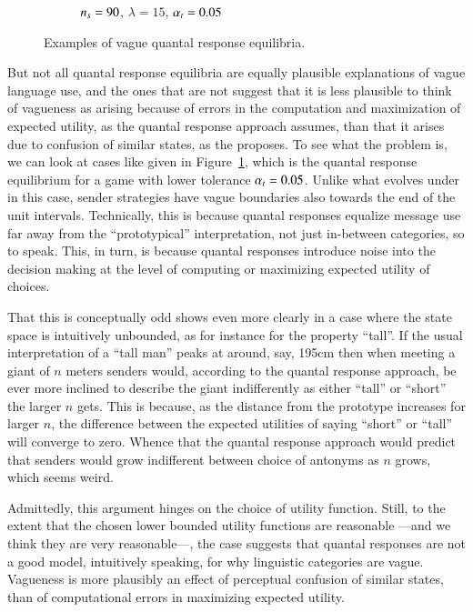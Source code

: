 \begin{figure}
\begin{subfigure}[]{0.45\textwidth}
    \caption{$n_s = 90$, $\lambda = 15$, $\alpha_t = 0.05$}
    \label{fig:exampleQRE_stratsB}
  \end{subfigure}

  \caption{Examples of vague quantal response equilibria.}
  \label{fig:exampleQREs}
\end{figure}


But not all quantal response equilibria are equally plausible
explanations of vague language use, and the ones that are not suggest
that it is less plausible to think of vagueness as arising because of
errors in the computation and maximization of expected utility, as the
quantal response approach assumes, than that it arises due to
confusion of similar states, as the \rdd proposes. To see what the
problem is, we can look at cases like given in
Figure~\ref{fig:exampleQRE_stratsB}, which is the quantal response
equilibrium for a game with lower tolerance $\alpha_t = 0.05$. Unlike
what evolves under \rdd in this case, sender strategies have vague
boundaries also towards the end of the unit intervals. Technically,
this is because quantal responses equalize message use far away from
the ``prototypical'' interpretation, not just in-between categories,
so to speak. This, in turn, is because quantal responses introduce
noise into the decision making at the level of computing or maximizing
expected utility of choices.

That this is conceptually odd shows even more clearly in a case where
the state space is intuitively unbounded, as for instance for the
property ``tall''. If the usual interpretation of a ``tall man'' peaks
at around, say, 195cm then when meeting a giant of $n$ meters senders
would, according to the quantal response approach, be ever more
inclined to describe the giant indifferently as either ``tall'' or
``short'' the larger $n$ gets. This is because, as the distance from
the prototype increases for larger $n$, the difference between the
expected utilities of saying ``short'' or ``tall'' will converge to
zero. Whence that the quantal response approach would predict that
senders would grow indifferent between choice of antonyms as $n$
grows, which seems weird. 

Admittedly, this argument hinges on the choice of utility
function. Still, to the extent that the chosen lower bounded utility
functions are reasonable ---and we think they are very reasonable---,
the case suggests that quantal responses are not a good model,
intuitively speaking, for why linguistic categories are
vague. Vagueness is more plausibly an effect of perceptual confusion
of similar states, than of computational errors in maximizing expected
utility.




